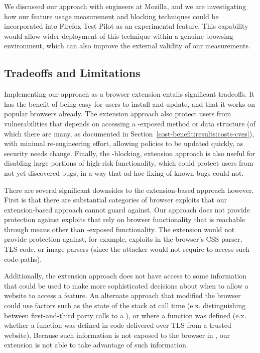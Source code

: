 We discussed our approach with engineers at Mozilla, and we are
investigating how our feature usage measurement and blocking techniques could be
incorporated into Firefox Test Pilot as an experimental feature. This
capability would allow wider deployment of this technique within a genuine
browsing environment, which can also improve the external validity of our
measurements.

\subsection{Tradeoffs and Limitations}
Implementing our approach as a browser extension entails significant tradeoffs.
It has the benefit of being easy for users to install and update, and that
it works on popular browsers already.  The extension approach also protect users
from vulnerabilities that depends on accessing a \JS-exposed
method or data structure (of which there are many, as documented in
Section~\ref{cost-benefit:results:costs-cves}), with minimal re-engineering effort,
allowing policies to be updated quickly, as security needs change.  Finally,
the \WAS-blocking, extension approach is also useful for disabling large
portions of high-risk functionality, which could protect users from not-yet-discovered
bugs, in a way that ad-hoc fixing of known bugs could not.

There are several significant downsides to the extension-based approach however.
First is that there are substantial categories of browser exploits that our
extension-based approach cannot guard against.  Our approach does not provide
protection against exploits that rely on browser functionality that is reachable
through means other than \JS-exposed functionality.  The extension would not
provide protection against, for example, exploits in the browser's CSS parser,
TLS code, or image parsers (since the attacker would not require \JS to
access such code-paths).

Additionally, the extension approach does not have access to some
information that could be used to make more sophisticated decisions about
when to allow a website to access a feature.  An alternate approach that
modified the browser could use factors such as the state of the stack at
call time (e.x. distinguishing between first-and-third party calls
to a \WAS), or where a function was defined (e.x. whether a function was defined
in \JS code delivered over TLS from a trusted website).  Because such information
is not exposed to the browser in \JS, our extension is not able to take advantage
of such information.

